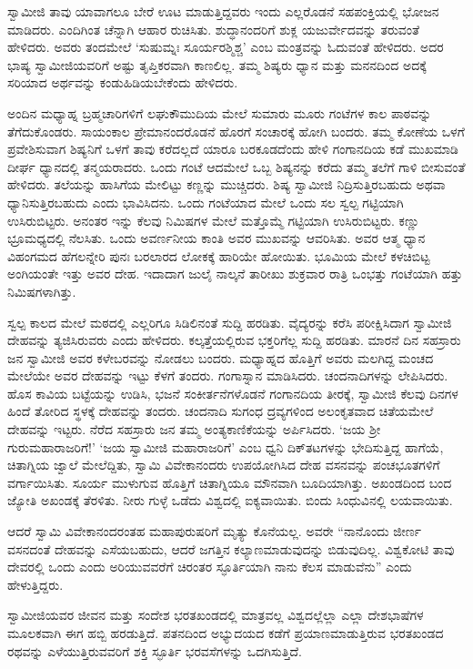  ಸ್ವಾಮೀಜಿ ತಾವು ಯಾವಾಗಲೂ ಬೇರೆ ಊಟ ಮಾಡುತ್ತಿದ್ದವರು ಇಂದು ಎಲ್ಲರೊಡನೆ ಸಹಪಂಕ್ತಿಯಲ್ಲಿ ಭೋಜನ ಮಾಡಿದರು. ಎಂದಿಗಿಂತ ಚೆನ್ನಾಗಿ ಆಹಾರ ರುಚಿಸಿತು. ಶುದ್ಧಾನಂದರಿಗೆ ಶುಕ್ಲ ಯಜುರ್ವೇದವನ್ನು ತರುವಂತೆ ಹೇಳಿದರು. ಅವರು ತಂದಮೇಲೆ ‘ಸುಷುಮ್ನಃ ಸೂರ್ಯರಶ್ಮಿಶ್ಚ’ ಎಂಬ ಮಂತ್ರವನ್ನು ಓದುವಂತೆ ಹೇಳಿದರು. ಅದರ ಭಾಷ್ಯ ಸ್ವಾಮೀಜಿಯವರಿಗೆ ಅಷ್ಟು ತೃಪ್ತಿಕರವಾಗಿ ಕಾಣಲಿಲ್ಲ. ತಮ್ಮ ಶಿಷ್ಯರು ಧ್ಯಾನ ಮತ್ತು ಮನನದಿಂದ ಅದಕ್ಕೆ ಸರಿಯಾದ ಅರ್ಥವನ್ನು ಕಂಡುಹಿಡಿಯಬೇಕೆಂದು ಹೇಳಿದರು. 

 ಅಂದಿನ ಮಧ್ಯಾಹ್ನ ಬ್ರಹ್ಮಚಾರಿಗಳಿಗೆ ಲಘುಕೌಮುದಿಯ ಮೇಲೆ ಸುಮಾರು ಮೂರು ಗಂಟೆಗಳ ಕಾಲ ಪಾಠವನ್ನು ತೆಗೆದುಕೊಂಡರು. ಸಾಯಂಕಾಲ ಪ್ರೇಮಾನಂದರೊಡನೆ ಹೊರಗೆ ಸಂಚಾರಕ್ಕೆ ಹೋಗಿ ಬಂದರು. ತಮ್ಮ ಕೋಣೆಯ ಒಳಗೆ ಪ್ರವೇಶಿಸುವಾಗ ಶಿಷ್ಯನಿಗೆ ಒಳಗೆ ತಾವು ಕರೆದಲ್ಲದೆ ಯಾರೂ ಬರಕೂಡದೆಂದು ಹೇಳಿ ಗಂಗಾನದಿಯ ಕಡೆ ಮುಖಮಾಡಿ ದೀರ್ಘ ಧ್ಯಾನದಲ್ಲಿ ತನ್ಮಯರಾದರು. ಒಂದು ಗಂಟೆ ಆದಮೇಲೆ ಒಬ್ಬ ಶಿಷ್ಯನನ್ನು ಕರೆದು ತಮ್ಮ ತಲೆಗೆ ಗಾಳಿ ಬೀಸುವಂತೆ ಹೇಳಿದರು. ತಲೆಯನ್ನು ಹಾಸಿಗೆಯ ಮೇಲಿಟ್ಟು ಕಣ್ಣನ್ನು ಮುಚ್ಚಿದರು. ಶಿಷ್ಯ ಸ್ವಾಮೀಜಿ ನಿದ್ರಿಸುತ್ತಿರಬಹುದು ಅಥವಾ ಧ್ಯಾನಿಸುತ್ತಿರಬಹುದು ಎಂದು ಭಾವಿಸಿದನು. ಒಂದು ಗಂಟೆಯಾದ ಮೇಲೆ ಒಂದು ಸಲ ಸ್ವಲ್ಪ ಗಟ್ಟಿಯಾಗಿ ಉಸಿರುಬಿಟ್ಟರು. ಅನಂತರ ಇನ್ನು ಕೆಲವು ನಿಮಿಷಗಳ ಮೇಲೆ ಮತ್ತೊಮ್ಮೆ ಗಟ್ಟಿಯಾಗಿ ಉಸಿರುಬಿಟ್ಟರು. ಕಣ್ಣು ಭ್ರೂಮಧ್ಯದಲ್ಲಿ ನೆಲಸಿತು. ಒಂದು ಅವರ್ಣನೀಯ ಕಾಂತಿ ಅವರ ಮುಖವನ್ನು ಆವರಿಸಿತು. ಅವರ ಆತ್ಮ ಧ್ಯಾನ ವಿಹಂಗಮದ ಹೆಗಲನ್ನೇರಿ ಪುನಃ ಬರಲಾರದ ಲೋಕಕ್ಕೆ ಹಾರಿಯೇ ಹೋಯಿತು. ಭೂಮಿಯ ಮೇಲೆ ಕಳಚಿಬಿಟ್ಟ ಅಂಗಿಯಂತೇ ಇತ್ತು ಅವರ ದೇಹ. ಇದಾದಾಗ ಜುಲೈ ನಾಲ್ಕನೆ ತಾರೀಖು ಶುಕ್ರವಾರ ರಾತ್ರಿ ಒಂಭತ್ತು ಗಂಟೆಯಾಗಿ ಹತ್ತು ನಿಮಿಷಗಳಾಗಿತ್ತು. 

 ಸ್ವಲ್ಪ ಕಾಲದ ಮೇಲೆ ಮಠದಲ್ಲಿ ಎಲ್ಲರಿಗೂ ಸಿಡಿಲಿನಂತೆ ಸುದ್ದಿ ಹರಡಿತು. ವೈದ್ಯರನ್ನು ಕರೆಸಿ ಪರೀಕ್ಷಿಸಿದಾಗ ಸ್ವಾಮೀಜಿ ದೇಹವನ್ನು ತ್ಯಜಿಸಿರುವರು ಎಂದು ಹೇಳಿದರು. ಕಲ್ಕತ್ತೆಯಲ್ಲಿರುವ ಭಕ್ತರಿಗೆಲ್ಲ ಸುದ್ದಿ ಹರಡಿತು. ಮಾರನೆ ದಿನ ಸಹಸ್ರಾರು ಜನ ಸ್ವಾಮೀಜಿ ಅವರ ಕಳೇಬರವನ್ನು ನೋಡಲು ಬಂದರು. ಮಧ್ಯಾಹ್ನದ ಹೊತ್ತಿಗೆ ಅವರು ಮಲಗಿದ್ದ ಮಂಚದ ಮೇಲೆಯೇ ಅವರ ದೇಹವನ್ನು ಇಟ್ಟು ಕೆಳಗೆ ತಂದರು. ಗಂಗಾಸ್ನಾನ ಮಾಡಿಸಿದರು. ಚಂದನಾದಿಗಳನ್ನು ಲೇಪಿಸಿದರು. ಹೊಸ ಕಾವಿಯ ಬಟ್ಟೆಯನ್ನು ಉಡಿಸಿ, ಭಜನೆ ಸಂಕೀರ್ತನೆಗಳೊಡನೆ ಗಂಗಾನದಿಯ ತೀರಕ್ಕೆ, ಸ್ವಾಮೀಜಿ ಕೆಲವು ದಿನಗಳ ಹಿಂದೆ ತೋರಿದ ಸ್ಥಳಕ್ಕೆ ದೇಹವನ್ನು ತಂದರು. ಚಂದನಾದಿ ಸುಗಂಧ ದ್ರವ್ಯಗಳಿಂದ ಅಲಂಕೃತವಾದ ಚಿತೆಯಮೇಲೆ ದೇಹವನ್ನು ಇಟ್ಟರು. ನೆರೆದ ಸಹಸ್ರಾರು ಜನ ತಮ್ಮ ಅಂತ್ಯಕಾಣಿಕೆಯನ್ನು ಅರ್ಪಿಸಿದರು. ‘ಜಯ ಶ‍್ರೀ ಗುರುಮಹಾರಾಜರಿಗೆ!’ ‘ಜಯ ಸ್ವಾಮೀಜಿ ಮಹಾರಾಜರಿಗೆ’ ಎಂಬ ಧ್ವನಿ ದಿಕ್‌ತಟಗಳನ್ನು ಭೇದಿಸುತ್ತಿದ್ದ ಹಾಗೆಯೆ, ಚಿತಾಗ್ನಿಯ ಜ್ವಾಲೆ ಮೇಲೆದ್ದಿತು, ಸ್ವಾಮಿ ವಿವೇಕಾನಂದರು ಉಪಯೋಗಿಸಿದ ದೇಹ ವಸನವನ್ನು ಪಂಚಭೂತಗಳಿಗೆ ವರ್ಗಾಯಿಸಿತು. ಸೂರ್ಯ ಮುಳುಗುವ ಹೊತ್ತಿಗೆ ಚಿತಾಗ್ನಿಯೂ ಮೌನವಾಗಿ ಬೂದಿಯಾಗಿತ್ತು. ಅಖಂಡದಿಂದ ಬಂದ ಜ್ಯೋತಿ ಅಖಂಡಕ್ಕೆ ತೆರಳಿತು. ನೀರು ಗುಳ್ಳೆ ಒಡೆದು ವಿಶ್ವದಲ್ಲಿ ಐಕ್ಯವಾಯಿತು. ಬಿಂದು ಸಿಂಧುವಿನಲ್ಲಿ ಲಯವಾಯಿತು. 

 ಆದರೆ ಸ್ವಾಮಿ ವಿವೇಕಾನಂದರಂತಹ ಮಹಾಪುರುಷರಿಗೆ ಮೃತ್ಯು ಕೊನೆಯಲ್ಲ. ಅವರೇ “ನಾನೊಂದು ಜೀರ್ಣ ವಸನದಂತೆ ದೇಹವನ್ನು ಎಸೆಯಬಹುದು, ಆದರೆ ಜಗತ್ತಿನ ಕಲ್ಯಾಣಮಾಡುವುದನ್ನು ಬಿಡುವುದಿಲ್ಲ. ವಿಶ್ವಕೋಟಿ ತಾವು ದೇವರಲ್ಲಿ ಒಂದು ಎಂದು ಅರಿಯುವವರೆಗೆ ಚಿರಂತರ ಸ್ಫೂರ್ತಿಯಾಗಿ ನಾನು ಕೆಲಸ ಮಾಡುವೆನು” ಎಂದು ಹೇಳುತ್ತಿದ್ದರು. 

 ಸ್ವಾಮೀಜಿಯವರ ಜೀವನ ಮತ್ತು ಸಂದೇಶ ಭರತಖಂಡದಲ್ಲಿ ಮಾತ್ರವಲ್ಲ ವಿಶ್ವದಲ್ಲೆಲ್ಲಾ ಎಲ್ಲಾ ದೇಶಭಾಷೆಗಳ ಮೂಲಕವಾಗಿ ಈಗ ಹಬ್ಬಿ ಹರಡುತ್ತಿದೆ. ಪತನದಿಂದ ಅಭ್ಯುದಯದ ಕಡೆಗೆ ಪ್ರಯಾಣಮಾಡುತ್ತಿರುವ ಭರತಖಂಡದ ರಥವನ್ನು ಎಳೆಯುತ್ತಿರುವವರಿಗೆ ಶಕ್ತಿ ಸ್ಫೂರ್ತಿ ಭರವಸೆಗಳನ್ನು ಒದಗಿಸುತ್ತಿದೆ. 

\delimiter

